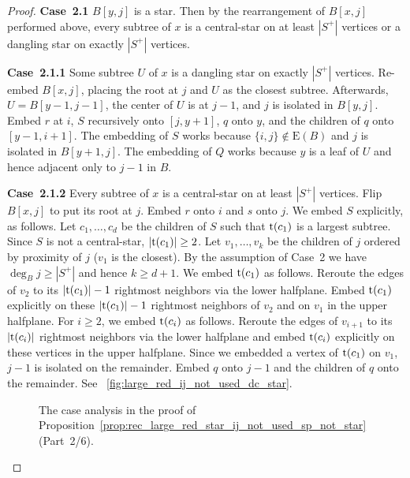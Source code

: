 \documentclass[11pt,a4paper,colorlinks=true,urlcolor=blue,citecolor=red]{article}
\theoremstyle{plain}
\newcommand{\case}[1]{\par\vspace{.5\baselineskip}\noindent\textbf{\sffamily Case~#1}}
\newcommand{\EB}{\mathrm{E}(B)}
\begin{document}
\begin{proof}
  \case{2.1} $B[y,j]$ is a star. Then by the rearrangement of $B[x,j]$
  performed above, every subtree of $x$ is a central-star on at least
  $|S^+|$ vertices or a dangling star on exactly $|S^+|$ vertices.

  \case{2.1.1} Some subtree $U$ of $x$ is a dangling star on exactly
  $|S^+|$ vertices. Re-embed $B[x,j]$, placing the root at $j$ and $U$
  as the closest subtree. Afterwards, $U=B[y-1,j-1]$, the center of $U$
  is at $j-1$, and $j$ is isolated in $B[y,j]$. Embed $r$ at $i$, $S$
  recursively onto $[j,y+1]$, $q$ onto $y$, and the children of $q$ onto
  $[y-1,i+1]$. The embedding of $S$ works because $\{i,j\}\not\in\EB$
  and $j$ is isolated in $B[y+1,j]$. The embedding of $Q$ works because
  $y$ is a leaf of $U$ and hence adjacent only to $j-1$ in $B$.

  \case{2.1.2} Every subtree of $x$ is a central-star on at least
  $|S^+|$ vertices. Flip $B[x,j]$ to put its root at $j$. Embed $r$
  onto $i$ and $s$ onto $j$. We embed $S$ explicitly, as follows. Let
  $c_1,\dots,c_d$ be the children of $S$ such that $\mathrm t(c_1)$ is a
  largest subtree. Since $S$ is not a central-star,
  $|\mathrm t(c_1)|\geq2$. Let $v_1,\dots,v_k$ be the children of $j$ ordered
  by proximity of $j$ ($v_1$ is the closest). By the assumption of
  Case~2 we have $\deg_B{j}\geq|S^+|$ and hence $k\geq d+1$. We embed
  $\mathrm t(c_1)$ as follows. Reroute the edges of $v_2$ to its
  $|\mathrm t(c_1)|-1$ rightmost neighbors via the lower halfplane. Embed
  $\mathrm t(c_1)$ explicitly on these $|\mathrm t(c_1)|-1$ rightmost neighbors of $v_2$
  and on $v_1$ in the upper halfplane. For $i\geq2$, we embed $\mathrm t(c_i)$
  as follows. Reroute the edges of $v_{i+1}$ to its $|\mathrm t(c_i)|$ rightmost
  neighbors via the lower halfplane and embed $\mathrm t(c_i)$ explicitly on
  these vertices in the upper halfplane. Since we embedded a vertex of
  $\mathrm t(c_1)$ on $v_1$, $j-1$ is isolated on the remainder. Embed $q$ onto
  $j-1$ and the children of $q$ onto the remainder. See
  \figurename~\ref{fig:large_red_ij_not_used_dc_star}.

  \begin{figure}[t]
    \centering\hfil {}\hfil {}\hfil {}\hfil \caption{The case analysis in the proof of
      Proposition~\ref{prop:rec_large_red_star_ij_not_used_sp_not_star}~(Part~2/6).}
  \end{figure}


\end{proof}
\end{document}
